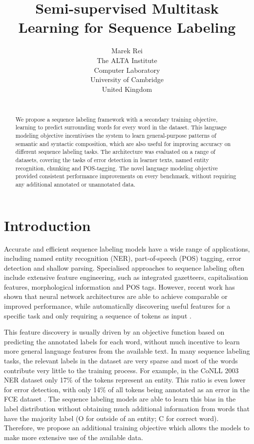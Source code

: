 \documentclass[11pt,a4paper]{article}
\title{Semi-supervised Multitask Learning for Sequence Labeling}
\author{\hspace{-0.5cm}Marek Rei\\
	    \hspace{-0.5cm}The ALTA Institute\\
	    \hspace{-0.5cm}Computer Laboratory\\
	    \hspace{-0.5cm}University of Cambridge\\
        \hspace{-0.5cm}United Kingdom\\
	    \hspace{-0.5cm}{\tt marek.rei@cl.cam.ac.uk} \\}
\date{}
\begin{document}
\maketitle
\begin{abstract}
We propose a sequence labeling framework with a secondary training objective, learning to predict surrounding words for every word in the dataset.
This language modeling objective incentivises the system to learn general-purpose patterns of semantic and syntactic composition, which are also useful for improving accuracy on different sequence labeling tasks.
The architecture was evaluated on a range of datasets, covering the tasks of error detection in learner texts, named entity recognition, chunking and POS-tagging.
The novel language modeling objective provided consistent performance improvements on every benchmark, without requiring any additional annotated or unannotated data.
\end{abstract}


\section{Introduction}

Accurate and efficient sequence labeling models have a wide range of applications, including named entity recognition (NER), part-of-speech (POS) tagging, error detection and shallow parsing.
Specialised approaches to sequence labeling often include extensive feature engineering, such as integrated gazetteers, capitalisation features, morphological information and POS tags.
However, recent work has shown that neural network architectures are able to achieve comparable or improved performance, while automatically discovering useful features for a specific task and only requiring a sequence of tokens as input \cite{Collobert2011,Irsoy2014a,Lample2016}. 



This feature discovery is usually driven by an objective function based on predicting the annotated labels for each word, without much incentive to learn more general language features from the available text.
In many sequence labeling tasks, the relevant labels in the dataset are very sparse and most of the words contribute very little to the training process. 
For example, in the CoNLL 2003 NER dataset \cite{TjongKimSang2003} only 17\% of the tokens represent an entity.
This ratio is even lower for error detection, with only 14\% of all tokens being annotated as an error in the FCE dataset \cite{Yannakoudakis2011}.
The sequence labeling models are able to learn this bias in the label distribution without obtaining much additional information from words that have the majority label (O for outside of an entity; C for correct word).
Therefore, we propose an additional training objective which allows the models to make more extensive use of the available data.
\end{document}
